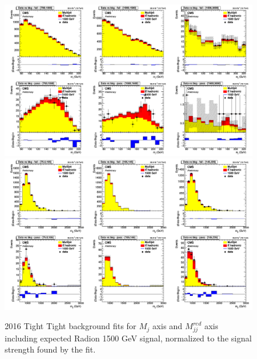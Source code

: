 \begin{figure}[!htb]
	\centering
	\includegraphics[width=1\textwidth]{Figures/postfit_projx_fits_16TT.png}
	\includegraphics[width=1\textwidth]{Figures/postfit_projy_fits_16TT.png}
	\caption{2016 Tight Tight background fits for $M_j$ axis and $M_{jj}^{red}$ axis including expected Radion 1500 GeV signal, normalized to the signal strength found by the fit.}
	\label{fig:16TT}
\end{figure}
